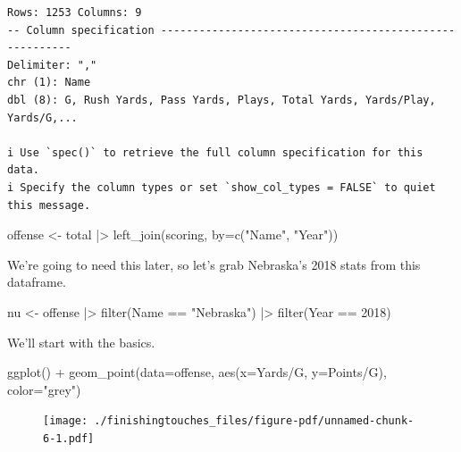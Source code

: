 \documentclass[
  letterpaper,
  DIV=11,
  numbers=noendperiod]{scrreprt}
\newenvironment{Shaded}{\begin{snugshade}}{\end{snugshade}}
\newcommand{\AttributeTok}[1]{\textcolor[rgb]{0.40,0.45,0.13}{#1}}
\newcommand{\DecValTok}[1]{\textcolor[rgb]{0.68,0.00,0.00}{#1}}
\newcommand{\FunctionTok}[1]{\textcolor[rgb]{0.28,0.35,0.67}{#1}}
\newcommand{\NormalTok}[1]{\textcolor[rgb]{0.00,0.23,0.31}{#1}}
\newcommand{\OtherTok}[1]{\textcolor[rgb]{0.00,0.23,0.31}{#1}}
\newcommand{\SpecialCharTok}[1]{\textcolor[rgb]{0.37,0.37,0.37}{#1}}
\newcommand{\StringTok}[1]{\textcolor[rgb]{0.13,0.47,0.30}{#1}}
\begin{document}
\begin{verbatim}
Rows: 1253 Columns: 9
-- Column specification --------------------------------------------------------
Delimiter: ","
chr (1): Name
dbl (8): G, Rush Yards, Pass Yards, Plays, Total Yards, Yards/Play, Yards/G,...

i Use `spec()` to retrieve the full column specification for this data.
i Specify the column types or set `show_col_types = FALSE` to quiet this message.
\end{verbatim}

\begin{Shaded}
\begin{Highlighting}[]
\NormalTok{offense }\OtherTok{\textless{}{-}}\NormalTok{ total }\SpecialCharTok{|\textgreater{}} \FunctionTok{left\_join}\NormalTok{(scoring, }\AttributeTok{by=}\FunctionTok{c}\NormalTok{(}\StringTok{"Name"}\NormalTok{, }\StringTok{"Year"}\NormalTok{))}
\end{Highlighting}
\end{Shaded}

We're going to need this later, so let's grab Nebraska's 2018 stats from
this dataframe.

\begin{Shaded}
\begin{Highlighting}[]
\NormalTok{nu }\OtherTok{\textless{}{-}}\NormalTok{ offense }\SpecialCharTok{|\textgreater{}} 
  \FunctionTok{filter}\NormalTok{(Name }\SpecialCharTok{==} \StringTok{"Nebraska"}\NormalTok{) }\SpecialCharTok{|\textgreater{}} 
  \FunctionTok{filter}\NormalTok{(Year }\SpecialCharTok{==} \DecValTok{2018}\NormalTok{)}
\end{Highlighting}
\end{Shaded}

We'll start with the basics.

\begin{Shaded}
\begin{Highlighting}[]
\FunctionTok{ggplot}\NormalTok{() }\SpecialCharTok{+} 
  \FunctionTok{geom\_point}\NormalTok{(}\AttributeTok{data=}\NormalTok{offense, }\FunctionTok{aes}\NormalTok{(}\AttributeTok{x=}\StringTok{\textasciigrave{}}\AttributeTok{Yards/G}\StringTok{\textasciigrave{}}\NormalTok{, }\AttributeTok{y=}\StringTok{\textasciigrave{}}\AttributeTok{Points/G}\StringTok{\textasciigrave{}}\NormalTok{), }\AttributeTok{color=}\StringTok{"grey"}\NormalTok{)}
\end{Highlighting}
\end{Shaded}

\begin{figure}[H]

{\centering \texttt{[image: ./finishingtouches\_files/figure-pdf/unnamed-chunk-6-1.pdf]}

}

\end{figure}
\end{document}
